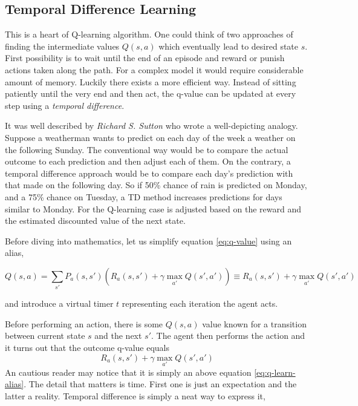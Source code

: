 \subsection{Temporal Difference Learning}
\label{sub:temporal-difference-learning}

This is a heart of Q-learning algorithm. One could think of two approaches of finding the intermediate values $Q(s, a)$ which eventually lead to desired state $s$. First possibility is to wait until the end of an episode and reward or punish actions taken along the path. For a complex model it would require considerable amount of memory. Luckily there exists a more efficient way. Instead of sitting patiently until the very end and then act, the q-value can be updated at every step using a \emph{temporal difference}.

It was well described by \emph {Richard S. Sutton} \cite{SuttonTD} who wrote a well-depicting analogy. Suppose a weatherman wants to predict on each day of the week a weather on the following Sunday. The conventional way would be to compare the actual outcome to each prediction and then adjust each of them. On the contrary, a temporal difference approach would be to compare each day's prediction with that made on the following day. So if 50\% chance of rain is predicted on Monday, and a 75\% chance on Tuesday, a TD method increases predictions for days similar to Monday. For the Q-learning case is adjusted based on the reward and the estimated discounted value of the next state.

Before diving into mathematics, let us simplify equation \ref{eq:q-value} using an alias,

\begin{equation}
    Q(s, a) = \sum_{s'} P_a(s, s') \left(R_a(s, s') + \gamma \max_{a'} Q(s', a') \right)
    \equiv
    R_a(s, s') + \gamma \max_{a'} Q(s', a')
\label{eq:q-learn-alias}
\end{equation}

and introduce a virtual timer $t$ representing each iteration the agent acts.

Before performing an action, there is some $Q(s, a)$ value known for a transition between current state $s$ and the next $s'$. The agent then performs the action and it turns out that the outcome q-value equals \[R_a(s, s') + \gamma \max_{a'} Q(s', a')\]
An cautious reader may notice that it is simply an above equation \ref{eq:q-learn-alias}. The detail that matters is time. First one is just an expectation and the latter a reality. Temporal difference is simply a neat way to express it,

